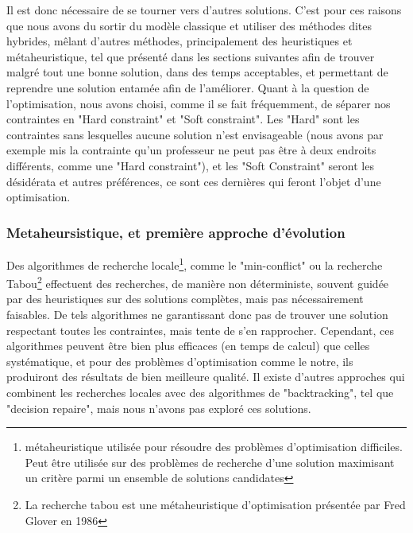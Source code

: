 Il est donc nécessaire de se tourner vers d'autres solutions.
\newline
\indent
C'est pour ces raisons que nous avons du sortir du modèle classique et utiliser des méthodes dites hybrides, mêlant d'autres méthodes, principalement des heuristiques et métaheuristique, tel que présenté dans les sections suivantes afin de trouver malgré tout une bonne solution, dans des temps acceptables, et permettant de reprendre une solution entamée afin de l'améliorer. \newline
Quant à la question de l'optimisation, nous avons choisi, comme il se fait fréquemment, de séparer nos contraintes en "Hard constraint" et "Soft constraint".  Les "Hard" sont les contraintes sans lesquelles aucune solution n'est envisageable (nous avons par exemple mis la contrainte qu'un professeur ne peut pas être à deux endroits différents, comme une "Hard constraint"), et les "Soft Constraint" seront les désidérata et autres préférences, ce sont ces dernières qui feront l'objet d'une optimisation. 
\subsubsection{Metaheursistique, et première approche d'évolution}
Des algorithmes de recherche locale\footnote{métaheuristique utilisée pour résoudre des problèmes d'optimisation difficiles. Peut être utilisée sur des problèmes de recherche d'une solution maximisant un critère parmi un ensemble de solutions candidates}, comme le "min-conflict" ou la recherche Tabou\footnote{La recherche tabou est une métaheuristique d'optimisation présentée par Fred Glover en 1986} effectuent des recherches, de manière non déterministe, souvent guidée par des heuristiques sur des solutions complètes, mais pas nécessairement faisables.  
De tels algorithmes ne garantissant donc pas de trouver une solution respectant toutes les contraintes, mais tente de s'en rapprocher. Cependant, ces algorithmes peuvent être bien plus efficaces (en temps de calcul) que celles systématique, et pour des problèmes d'optimisation comme le notre, ils produiront des résultats de bien meilleure qualité.
Il existe d'autres approches qui combinent les recherches locales avec des algorithmes de "backtracking", tel que "decision repaire", mais nous n'avons pas exploré ces solutions.

